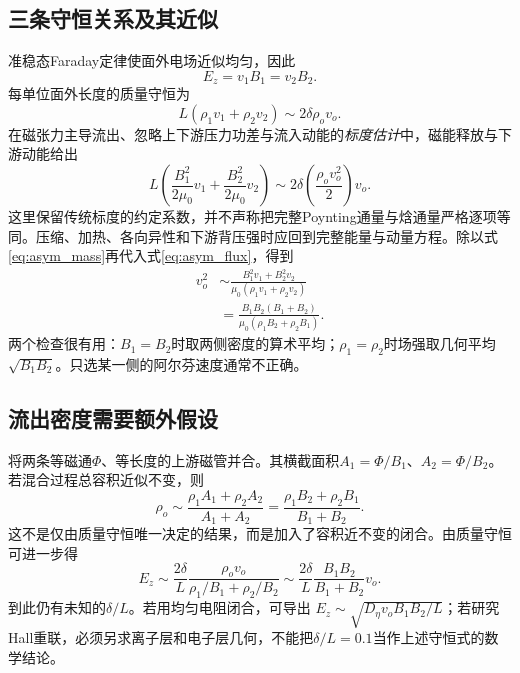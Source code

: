 \subsection{三条守恒关系及其近似}
准稳态Faraday定律使面外电场近似均匀，因此
\begin{equation}
 E_z=v_1B_1=v_2B_2.
 \label{eq:asym_flux}
\end{equation}
每单位面外长度的质量守恒为
\begin{equation}
 L(\rho_1v_1+\rho_2v_2)\sim2\delta\rho_o v_o.
 \label{eq:asym_mass}
\end{equation}
在磁张力主导流出、忽略上下游压力功差与流入动能的\emph{标度估计}中，磁能释放与下游动能给出
\begin{equation}
 L\left(\frac{B_1^2}{2\mu_0}v_1+\frac{B_2^2}{2\mu_0}v_2\right)
 \sim2\delta\left(\frac{\rho_o v_o^2}{2}\right)v_o.
\end{equation}
这里保留传统标度的约定系数，并不声称把完整Poynting通量与焓通量严格逐项等同。压缩、加热、各向异性和下游背压强时应回到完整能量与动量方程。除以式\eqref{eq:asym_mass}再代入式\eqref{eq:asym_flux}，得到
\begin{align}
 v_o^2&\sim\frac{B_1^2v_1+B_2^2v_2}
 {\mu_0(\rho_1v_1+\rho_2v_2)}\nonumber\\
 &=\boxed{\frac{B_1B_2(B_1+B_2)}{\mu_0(\rho_1B_2+\rho_2B_1)}}.
\end{align}
两个检查很有用：$B_1=B_2$时取两侧密度的算术平均；$\rho_1=\rho_2$时场强取几何平均$\sqrt{B_1B_2}$。只选某一侧的阿尔芬速度通常不正确。

\subsection{流出密度需要额外假设}
将两条等磁通$\Phi$、等长度的上游磁管并合。其横截面积$A_1=\Phi/B_1$、$A_2=\Phi/B_2$。若混合过程总容积近似不变，则
\begin{equation}
 \rho_o\sim\frac{\rho_1A_1+\rho_2A_2}{A_1+A_2}
 =\frac{\rho_1B_2+\rho_2B_1}{B_1+B_2}.
\end{equation}
这不是仅由质量守恒唯一决定的结果，而是加入了容积近不变的闭合。由质量守恒可进一步得
\begin{equation}
 E_z\sim\frac{2\delta}{L}
 \frac{\rho_o v_o}{\rho_1/B_1+\rho_2/B_2}
 \sim\frac{2\delta}{L}\frac{B_1B_2}{B_1+B_2}v_o.
\end{equation}
到此仍有未知的$\delta/L$。若用均匀电阻闭合，可导出
$E_z\sim\sqrt{D_\eta v_o B_1B_2/L}$；若研究Hall重联，必须另求离子层和电子层几何，不能把$\delta/L=0.1$当作上述守恒式的数学结论。

